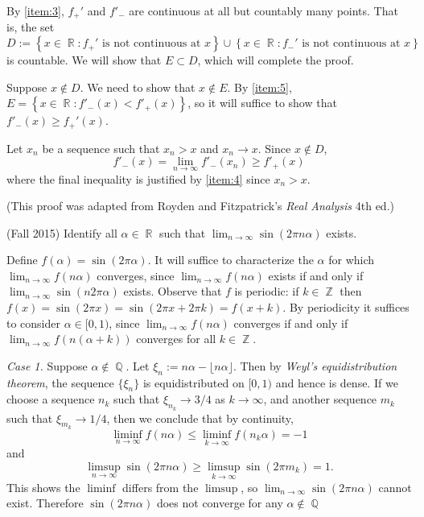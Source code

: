 \documentclass[answers]{exam}
\DeclareMathOperator{\RR}{\mathbb{R}}
\DeclareMathOperator{\ZZ}{\mathbb{Z}}
\DeclareMathOperator{\QQ}{\mathbb{Q}}
\begin{document}
\begin{questions}
\begin{solution}
By \ref{item:3}, $f_{+}'$ and $f'_{-}$ are continuous at all but countably many points. That is, the set  $$D:=\left\{ x\in \RR: f_{+}'\text{ is not continuous at }x \right\}\cup \left\{ x\in \RR: f_{-}'\text{ is not continuous at }x \right\}$$ is countable. We will show that $E\subset D$, which will complete the proof.

Suppose $x\notin D$. We need to show that $x\notin E$. By \ref{item:5}, $E=\left\{ x\in \RR : f'_{-}(x)< f'_{+}(x) \right\}$, so it will suffice to show that $f'_{-}(x)\geq f_{+}'(x)$.

Let $x_{n}$ be a sequence such that $x_{n}>x$ and $x_{n}\to x$. Since $x\notin D$,
\begin{equation*}
  f'_{-}(x)=\lim_{n \to \infty} f'_{-}(x_{n})\geq f'_{+}(x)
\end{equation*}
where the final inequality is justified by \ref{item:4} since $x_{n}>x$.

(This proof was adapted from Royden and Fitzpatrick's \textit{Real Analysis} 4th ed.)
\end{solution}

\question (Fall 2015) Identify all $\alpha\in \RR$ such that $\lim_{n\to\infty} \sin(2 \pi n \alpha)$ exists.

\begin{solution}
	Define $f(\alpha)=\sin(2\pi \alpha)$. It will suffice to characterize the $\alpha$ for which $\lim_{n \to \infty} f(n\alpha)$ converges, since $\lim_{n \to \infty} f(n\alpha)$ exists if and only if $\lim_{n \to \infty} \sin(n2\pi \alpha)$ exists. Observe that $f$ is periodic: if $k\in \ZZ$ then $f(x)=\sin(2\pi x) = \sin(2\pi x +2\pi k) =f(x+k)$. By periodicity it suffices to consider $\alpha\in [0,1)$, since $\lim_{n \to \infty} f(n\alpha)$ converges if and only if $\lim_{n \to \infty} f(n(\alpha+k))$ converges for all $k\in \ZZ$. 

  \textit{Case 1.} Suppose $\alpha \notin \QQ$. Let $\xi_{n}:= n\alpha - \lfloor n\alpha \rfloor$. Then by \emph{Weyl's equidistribution theorem}, the sequence $\{ \xi_{n} \}$ is equidistributed on $[0,1)$ and hence is dense. If we choose a sequence $n_k$ such that $\xi_{n_k} \to 3/4$ as $k \to \infty$, and another sequence $m_k$ such that $\xi_{m_k} \to 1/4$, then we conclude that by continuity,
  \[ \liminf_{n \to \infty} f(n \alpha) \leq \liminf_{k \to \infty} f(n_k \alpha) = -1 \]
  and
  \[ \limsup_{n \to \infty} \sin(2 \pi n \alpha) \geq \limsup_{k \to \infty} \sin(2 \pi m_k) = 1. \]
  This shows the $\liminf$ differs from the $\limsup$, so $\lim_{n \to \infty} \sin(2 \pi n \alpha)$ cannot exist. Therefore $\sin(2\pi n \alpha)$ does not converge for any $\alpha\notin \QQ$
  

\end{solution}
\end{questions}
\end{document}
